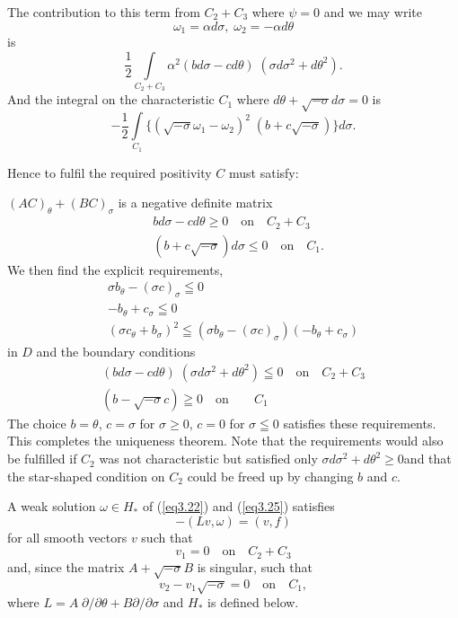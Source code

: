 The contribution to this term from $C_2  + C_3$ where $\psi = 0$ and we may write
\begin{equation*}
\omega_1 = \alpha d\sigma, \; \omega_2 = - \alpha d \theta\tag{3.25}\label{eq3.25}
\end{equation*}
is\pageoriginale
$$
\frac{1}{2} \int\limits_{C_2 + C_3} \alpha^2 (bd\sigma - cd\theta) \; (\sigma d \sigma^2 + d \theta^2). 
$$
And the integral on the characteristic $C_1$ where $d\theta + \sqrt{-\sigma} d\sigma = 0$ is
$$
-\frac{1}{2} \int\limits_{C_1} \{ (\sqrt{-\sigma} \omega_1 - \omega_2)^2 \; (b + c\sqrt{-\sigma})\} d \sigma.
$$

Hence to fulfil the required positivity $C$ must satisfy:

$(AC)_\theta + (BC)_\sigma$ is a negative definite matrix
\begin{align*}
& bd \sigma - cd \theta \geq 0 \quad \text{on} \quad C_2 + C_3\\
&  (b+c\sqrt{-\sigma}) d \sigma \leq 0 \quad \text{on} \quad C_1. 
\end{align*}
We then find the explicit requirements,
\begin{align*}
\sigma b_\theta - (\sigma c)_\sigma \leqq 0\\
-b_\theta + c_\sigma \leqq 0 \tag{3.26}\label{eq3.26}\\
(\sigma c_\theta + b_\sigma)^2 \leqq (\sigma b_\theta - (\sigma c)_\sigma) (-b_\theta + c_\sigma)  
\end{align*}
 in $D$ and the boundary conditions
\begin{gather*}
(bd\sigma -cd\theta) \; (\sigma d\sigma^2 + d\theta^2) \leqq 0 \quad\text{on} \quad C_2 + C_3\\
(b -\sqrt{-\sigma} c) \geqq 0 \quad \text{on}\qquad  C_1
\end{gather*}
The choice $b = \theta$, $c = \sigma$ for $\sigma \geq 0$, $c=0$ for $\sigma \leqq 0$ satisfies these requirements. This completes the uniqueness theorem. Note that the requirements would also be fulfilled if $C_2$ was not characteristic but satisfied only
$\sigma d \sigma^2 + d\theta^2 \geq 0$\pageoriginale and that the star-shaped condition on $C_2$ could be freed up by changing $b$ and $c$.

A weak solution $\omega \in H_*$ of (\ref{eq3.22}) and (\ref{eq3.25}) satisfies
$$
-(Lv, \omega) = (v,f)
$$
for all smooth vectors $v$ such that
$$
v_1 = 0 \quad \text{on} \quad C_2 + C_3
$$
and, since the matrix $A + \sqrt{-\sigma} B$ is singular, such that 
$$
v_2 -v_1 \sqrt{-\sigma} = 0 \quad \text{on}\quad C_1,
$$
where $L = A \; \partial / \partial \theta + B \partial /\partial \sigma$ and $H_*$ is defined below.

